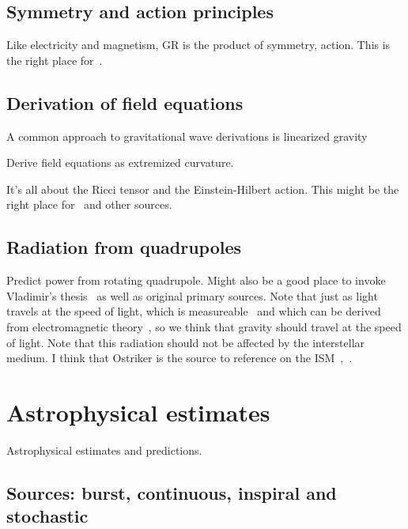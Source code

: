         \subsection{Symmetry and action principles}
        \label{principles}

            Like electricity and magnetism, GR is the product of symmetry, action. This is the right place for~\cite{Carroll1997}.

        \subsection{Derivation of field equations}
        \label{field_equations}

            A common approach to gravitational wave derivations is linearized gravity~\cite{FlanaganHughes2005}

            Derive field equations as extremized curvature.

		It's all about the Ricci tensor and the Einstein-Hilbert action. This might be the right place for~\cite{FarrThesis} and other sources.

        \subsection{Radiation from quadrupoles}
        \label{radiation}
  
            Predict power from rotating quadrupole. Might also be a good place to invoke Vladimir's thesis~\cite{DergachevThesis} as well as original primary sources. Note that just as light travels at the speed of light, which is measureable~\cite{CODATA} and which can be derived from electromagnetic theory~\cite{GriffithsE}, so we think that gravity should travel at the speed of light. Note that this radiation should not be affected by the interstellar medium. I think that Ostriker is the source to reference on the ISM~\cite{Caldwell1981},~\cite{McKee1977}.

    \section{Astrophysical estimates}
    \label{estimates}

        Astrophysical estimates and predictions.

        \subsection{Sources: burst, continuous, inspiral and stochastic}
        \label{source_types}

